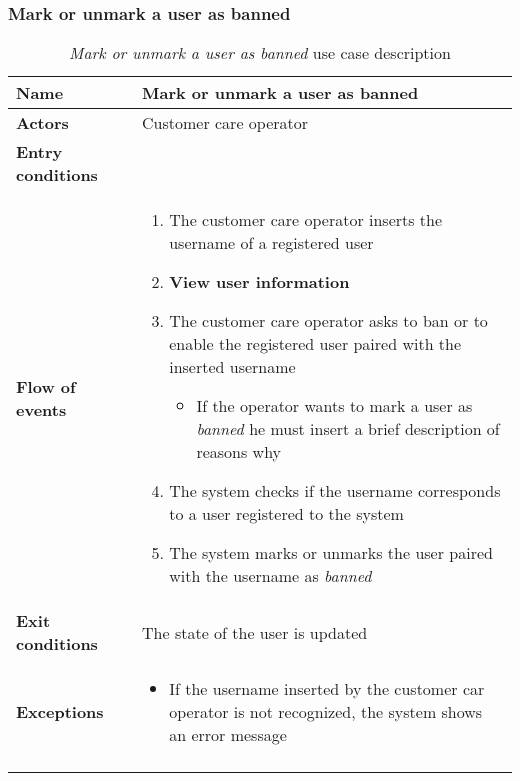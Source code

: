 \subsubsection{Mark or unmark a user as banned}
\begin{longtable}{p{0.25\linewidth}p{0.75\linewidth}}
\toprule
\textbf{Name} & \textbf{Mark or unmark a user as banned} \\
\midrule
\textbf{Actors} &  Customer care operator\\
\midrule
\textbf{Entry conditions} & \\
\midrule
\textbf{Flow of events} & 
\begin{enumerate}
	\item The customer care operator inserts the username of a registered user
	\item \textbf{View user information}
	\item The customer care operator asks to ban or to enable the registered user paired with the inserted username
		\begin{itemize}
			\item If the operator wants to mark a user as \emph{banned} he must insert a brief description of reasons why  
		\end{itemize}		 
	\item The system checks if the username corresponds to a user registered to the system
	\item The system marks or unmarks the user paired with the username as \emph{banned}
\end{enumerate} \\
\midrule
\textbf{Exit conditions} & The state of the user is updated \\
\midrule
\textbf{Exceptions} & 
\begin{itemize}
	\item If the username inserted by the customer car operator is not recognized, the system shows an error message
\end{itemize} \\
\bottomrule
\caption{\emph{Mark or unmark a user as banned} use case description}
\end{longtable}

\clearpage
